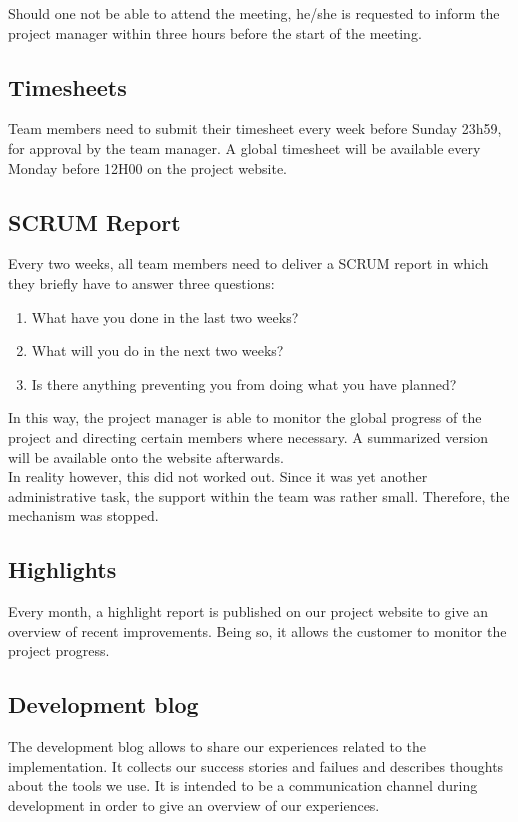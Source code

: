 \documentclass[salesmen, twoside]{../../../templates/latex/2009/softproj}
\begin{document}
\begin{projdoc}
			Should one not be able to attend the meeting, he/she is requested to inform
			the project manager within three hours before the start of the meeting.
			
			\subsection{Timesheets}
			Team members need to submit their timesheet every week before Sunday 23h59, for approval by the team manager.
			A global timesheet will be available every Monday before 12H00 on the project website. 
			
			\subsection{SCRUM Report}
			Every two weeks, all team members need to deliver a SCRUM report in which they briefly have to
			answer three questions:
			
			\begin{enumerate}
				\item What have you done in the last two weeks?
				\item What will you do in the next two weeks?
				\item Is there anything preventing you from doing what you have
				planned?
			\end{enumerate}	
			
			In this way, the project manager is able to monitor the global progress of the project
			and directing certain members where necessary. A summarized version will be available
			onto the website afterwards. \\
			
			In reality however, this did not worked out. Since it was yet another administrative task, the support within
			the team was rather small. Therefore, the mechanism was stopped. 
			
			\subsection{Highlights}
			Every month, a highlight report is published on our project website
			to give an overview of recent improvements. Being so, it allows the customer to monitor the project progress. 
			
			\subsection{Development blog}
			The development blog allows to share our experiences related to the implementation. 
			It collects our success stories and failues and describes thoughts about the tools we use. It is intended
			to be a communication channel during development in order to give an overview of our experiences.
			

\end{projdoc}
\end{document}
